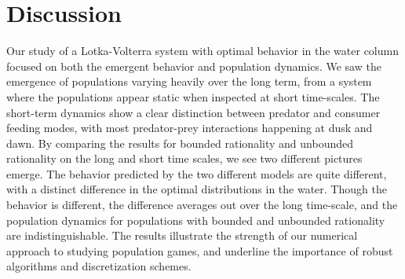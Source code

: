 \section{Discussion}

Our study of a Lotka-Volterra system with optimal behavior in the water column focused on both the emergent behavior and population dynamics. We saw the emergence of populations varying heavily over the long term, from a system where the populations appear static when inspected at short time-scales. The short-term dynamics show a clear distinction between predator and consumer feeding modes, with most predator-prey interactions happening at dusk and dawn. By comparing the results for bounded rationality and unbounded rationality on the long and short time scales, we see two different pictures emerge. The behavior predicted by the two different models are quite different, with a distinct difference in the optimal distributions in the water. Though the behavior is different, the difference averages out over the long time-scale, and the population dynamics for populations with bounded and unbounded rationality are indistinguishable. The results illustrate the strength of our numerical approach to studying population games, and underline the importance of robust algorithms and discretization schemes.



